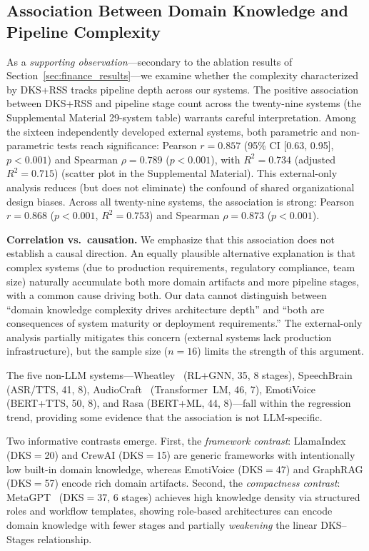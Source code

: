 \documentclass[fleqn,10pt,lineno]{wlpeerj}
\begin{document}
\subsection{Association Between Domain Knowledge and Pipeline Complexity}

As a \textit{supporting observation}---secondary to the ablation results of Section~\ref{sec:finance_results}---we examine whether the complexity characterized by DKS+RSS tracks pipeline depth across our systems. The positive association between DKS+RSS and pipeline stage count across the twenty-nine systems (the Supplemental Material 29-system table) warrants careful interpretation. Among the sixteen independently developed external systems, both parametric and non-parametric tests reach significance: Pearson $r = 0.857$ (95\% CI [0.63, 0.95], $p < 0.001$) and Spearman $\rho = 0.789$ ($p < 0.001$), with $R^2 = 0.734$ (adjusted $R^2 = 0.715$) (scatter plot in the Supplemental Material). This external-only analysis reduces (but does not eliminate) the confound of shared organizational design biases. Across all twenty-nine systems, the association is strong: Pearson $r = 0.868$ ($p < 0.001$, $R^2 = 0.753$) and Spearman $\rho = 0.873$ ($p < 0.001$).

\textbf{Correlation vs.\ causation.} We emphasize that this association does not establish a causal direction. An equally plausible alternative explanation is that complex systems (due to production requirements, regulatory compliance, team size) naturally accumulate both more domain artifacts and more pipeline stages, with a common cause driving both. Our data cannot distinguish between ``domain knowledge complexity drives architecture depth'' and ``both are consequences of system maturity or deployment requirements.'' The external-only analysis partially mitigates this concern (external systems lack production infrastructure), but the sample size ($n = 16$) limits the strength of this argument.

The five non-LLM systems---Wheatley~\citep{wheatley} (RL+GNN, 35, 8 stages), SpeechBrain~\citep{speechbrain} (ASR/TTS, 41, 8), AudioCraft~\citep{audiocraft} (Transformer~LM, 46, 7), EmotiVoice~\citep{emotivoice} (BERT+TTS, 50, 8), and Rasa (BERT+ML, 44, 8)---fall within the regression trend, providing some evidence that the association is not LLM-specific.

Two informative contrasts emerge. First, the \textit{framework contrast}: LlamaIndex~\citep{llamaindex} (DKS$=$20) and CrewAI (DKS$=$15) are generic frameworks with intentionally low built-in domain knowledge, whereas EmotiVoice (DKS$=$47) and GraphRAG (DKS$=$57) encode rich domain artifacts. Second, the \textit{compactness contrast}: MetaGPT~\citep{metagpt} (DKS$=$37, 6 stages) achieves high knowledge density via structured roles and workflow templates, showing role-based architectures can encode domain knowledge with fewer stages and partially \textit{weakening} the linear DKS--Stages relationship.
\end{document}
